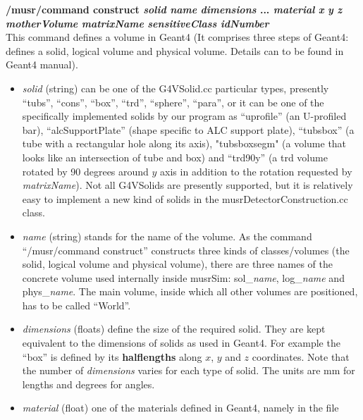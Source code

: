 \documentclass[twoside]{dis04}
\begin{document}
\begin{description}
\item{\bf /musr/command construct \emph{solid} \emph{name} \emph{dimensions} ... \emph{material} 
	\emph{x} \emph{y} \emph{z} \emph{motherVolume} \emph{matrixName} 
	\emph{sensitiveClass} \emph{idNumber} }\\
	This command defines a volume in {\sc Geant4} (It comprises three steps of {\sc Geant4}: defines a solid,
        logical volume and physical volume.  Details can to be found in {\sc Geant4} manual). \\
	\begin{itemize}
	\item \emph{solid} (string) can be one of the G4VSolid.cc particular types, presently ``tubs'', ``cons'',
	             ``box'', ``trd'', ``sphere'', ``para'',
	             or it can be one of the specifically implemented solids by our program as ``uprofile'' 
	             (an U-profiled bar), ``alcSupportPlate'' (shape specific to ALC support plate), ``tubsbox'' 
	             (a tube with a rectangular hole along its axis), "tubsboxsegm" 
	             (a volume that looks like an intersection of tube and box) and 
                     ``trd90y'' (a trd volume rotated by 90 degrees around $y$ axis in addition
                     to the rotation requested by \emph{matrixName}).  Not all G4VSolids are
                     presently supported, but it is relatively easy to implement a new kind of solids
                     in the musrDetectorConstruction.cc class.
	\item \emph{name} (string) stands for the name of the volume.  As the command 
		     ``/musr/command construct'' constructs
	             three kinds of classes/volumes (the solid, logical volume and physical 
	             volume), there are three names of the concrete volume used internally inside 
                     musrSim: sol\_\emph{name}, log\_\emph{name} and phys\_\emph{name}.
	              The main volume, inside which all other volumes are positioned, has to be called  ``World''.
	\item \emph{dimensions} (floats) define the size of the required solid.  They are kept equivalent to the
	             dimensions of solids as used in {\sc Geant4}.  For example the ``box'' is defined
	             by its {\bf halflengths} along $x$, $y$ and $z$ coordinates.  Note that the number of
	             \emph{dimensions} varies for each type of solid.  The units are mm for lengths
		     and degrees for angles.
	\item \emph{material} (float) one of the materials defined in {\sc Geant4}, namely in the file 

\end{itemize}
\end{description}
\end{document}
